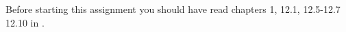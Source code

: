 Before starting this assignment you should have read chapters 1, 12.1, 12.5-12.7
12.10 in \cite{nemeth2011ual}.
